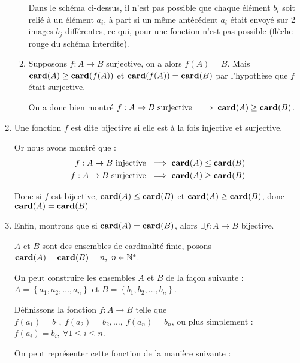 \begin{exercice}
\begin{enumerate}
\begin{enumerate}
        Dans le schéma ci-dessus, il n'est pas possible que chaque élément $b_i$ soit relié à un élément $a_i$, à part si un même antécédent $a_i$ était envoyé sur 2 images $b_j$ différentes, ce qui, pour une fonction n'est pas possible (flèche rouge du schéma interdite).


        \item Supposons $f:A\rightarrow B$ surjective, on a alors $f(A) = B$. Mais $\mathbf{card}(A) \geq \mathbf{card}(f(A))$ et $\mathbf{card}(f(A)) = \mathbf{card}(B)$ par l'hypothèse que $f$ était surjective.

        On a donc bien montré $f:A\rightarrow B \text{ surjective } \implies \mathbf{card}(A) \geq \mathbf{card}(B)$.
    \end{enumerate}


    \item Une fonction $f$ est dite bijective si elle est à la fois injective et surjective.

    Or nous avons montré que :
    \begin{align*}
        f:A\rightarrow B \text{ injective } &\implies \mathbf{card}(A) \leq \mathbf{card}(B)\\
        f:A\rightarrow B \text{ surjective } &\implies \mathbf{card}(A) \geq \mathbf{card}(B)
    \end{align*}

    Donc si $f$ est bijective,  $\mathbf{card}(A) \leq \mathbf{card}(B)$ et $\mathbf{card}(A) \geq \mathbf{card}(B)$, donc $\mathbf{card}(A) = \mathbf{card}(B)$

    \item Enfin, montrons que si $\mathbf{card}(A) = \mathbf{card}(B)$, alors $\exists f:A\rightarrow B$ bijective.

    $A$ et $B$ sont des ensembles de cardinalité finie, posons $\mathbf{card}(A) = \mathbf{card}(B) = n,\ n \in \mathbb{N}^*$.
    
    On peut construire les ensembles $A$ et $B$ de la façon suivante : $A = \left\{a_1, a_2, \ldots, a_n\right\}$ et $B = \left\{b_1, b_2, \ldots, b_n\right\}$.

    Définissons la fonction $f:A\rightarrow B$ telle que $f(a_1) = b_1,\ f(a_2) = b_2, \ldots,\ f(a_n) = b_n$, ou plus simplement : $f(a_i) = b_i,\ \forall 1 \leq i \leq n$.

    On peut représenter cette fonction de la manière suivante :
        \begin{center}
\end{center}
\end{enumerate}
\end{exercice}
